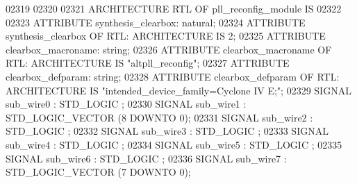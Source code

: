 \begin{DoxyCode}
{02319 
02320 
02321 \textcolor{keywordflow}{ARCHITECTURE} RTL \textcolor{keywordflow}{OF} pll_reconfig_module IS
02322 
02323     \textcolor{keywordflow}{ATTRIBUTE} \textcolor{vhdlchar}{synthesis_clearbox}\textcolor{vhdlchar}{:} \textcolor{comment}{natural};
02324     \textcolor{keywordflow}{ATTRIBUTE} \textcolor{vhdlchar}{synthesis_clearbox} \textcolor{keywordflow}{OF} \textcolor{vhdlchar}{RTL}\textcolor{vhdlchar}{:} \textcolor{keywordflow}{ARCHITECTURE} \textcolor{keywordflow}{IS} \textcolor{vhdllogic}{}\textcolor{vhdllogic}{2};
02325     \textcolor{keywordflow}{ATTRIBUTE} \textcolor{vhdlchar}{clearbox_macroname}\textcolor{vhdlchar}{:} \textcolor{comment}{string};
02326     \textcolor{keywordflow}{ATTRIBUTE} \textcolor{vhdlchar}{clearbox_macroname} \textcolor{keywordflow}{OF} \textcolor{vhdlchar}{RTL}\textcolor{vhdlchar}{:} \textcolor{keywordflow}{ARCHITECTURE} \textcolor{keywordflow}{IS} \textcolor{keyword}{"altpll\_reconfig"};
02327     \textcolor{keywordflow}{ATTRIBUTE} \textcolor{vhdlchar}{clearbox_defparam}\textcolor{vhdlchar}{:} \textcolor{comment}{string};
02328     \textcolor{keywordflow}{ATTRIBUTE} \textcolor{vhdlchar}{clearbox_defparam} \textcolor{keywordflow}{OF} \textcolor{vhdlchar}{RTL}\textcolor{vhdlchar}{:} \textcolor{keywordflow}{ARCHITECTURE} \textcolor{keywordflow}{IS} \textcolor{keyword}{"intended\_device\_family=Cyclone IV E;"};
02329     \textcolor{keywordflow}{SIGNAL} \textcolor{vhdlchar}{sub_wire0}    \textcolor{vhdlchar}{:} \textcolor{comment}{STD\_LOGIC} ;
02330     \textcolor{keywordflow}{SIGNAL} \textcolor{vhdlchar}{sub_wire1}    \textcolor{vhdlchar}{:} \textcolor{comment}{STD\_LOGIC\_VECTOR} \textcolor{vhdlchar}{(}\textcolor{vhdllogic}{}\textcolor{vhdllogic}{8} \textcolor{keywordflow}{DOWNTO} \textcolor{vhdllogic}{}\textcolor{vhdllogic}{0}\textcolor{vhdlchar}{)};
02331     \textcolor{keywordflow}{SIGNAL} \textcolor{vhdlchar}{sub_wire2}    \textcolor{vhdlchar}{:} \textcolor{comment}{STD\_LOGIC} ;
02332     \textcolor{keywordflow}{SIGNAL} \textcolor{vhdlchar}{sub_wire3}    \textcolor{vhdlchar}{:} \textcolor{comment}{STD\_LOGIC} ;
02333     \textcolor{keywordflow}{SIGNAL} \textcolor{vhdlchar}{sub_wire4}    \textcolor{vhdlchar}{:} \textcolor{comment}{STD\_LOGIC} ;
02334     \textcolor{keywordflow}{SIGNAL} \textcolor{vhdlchar}{sub_wire5}    \textcolor{vhdlchar}{:} \textcolor{comment}{STD\_LOGIC} ;
02335     \textcolor{keywordflow}{SIGNAL} \textcolor{vhdlchar}{sub_wire6}    \textcolor{vhdlchar}{:} \textcolor{comment}{STD\_LOGIC} ;
02336     \textcolor{keywordflow}{SIGNAL} \textcolor{vhdlchar}{sub_wire7}    \textcolor{vhdlchar}{:} \textcolor{comment}{STD\_LOGIC\_VECTOR} \textcolor{vhdlchar}{(}\textcolor{vhdllogic}{}\textcolor{vhdllogic}{7} \textcolor{keywordflow}{DOWNTO} \textcolor{vhdllogic}{}\textcolor{vhdllogic}{0}\textcolor{vhdlchar}{)};
}
\end{DoxyCode}
